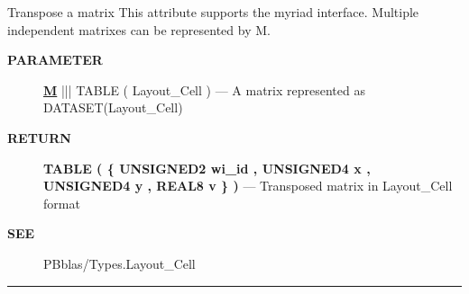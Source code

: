 Transpose a matrix This attribute supports the myriad interface. Multiple independent matrixes can be represented by M.






\par
\begin{description}
\item [\colorbox{tagtype}{\color{white} \textbf{\textsf{PARAMETER}}}] \textbf{\underline{M}} ||| TABLE ( Layout\_Cell ) --- A matrix represented as DATASET(Layout\_Cell)
\end{description}







\par
\begin{description}
\item [\colorbox{tagtype}{\color{white} \textbf{\textsf{RETURN}}}] \textbf{TABLE ( \{ UNSIGNED2 wi\_id , UNSIGNED4 x , UNSIGNED4 y , REAL8 v \} )} --- Transposed matrix in Layout\_Cell format
\end{description}







\par
\begin{description}
\item [\colorbox{tagtype}{\color{white} \textbf{\textsf{SEE}}}] PBblas/Types.Layout\_Cell
\end{description}



\rule{\linewidth}{0.5pt}


